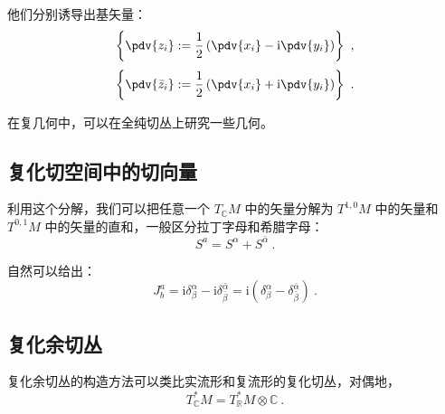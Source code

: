 他们分别诱导出基矢量：
\begin{equation}
\left\{ \pdv{z_i} := \frac{1}{2} \left( \pdv{x_i} - \mathrm i \pdv{y_i} \right) \right\} ~,
\end{equation}
\begin{equation} 
\left\{ \pdv{\bar z_i} := \frac{1}{2} \left( \pdv{x_i} + \mathrm i \pdv{y_i} \right)\right\} ~.
\end{equation}

在复几何中，可以在全纯切丛上研究一些几何。

\subsection{复化切空间中的切向量}
利用这个分解，我们可以把任意一个 $T_\mathbb C M$ 中的矢量分解为 $T^{1, 0} M$ 中的矢量和 $T^{0, 1} M$ 中的矢量的直和，一般区分拉丁字母和希腊字母：
\begin{equation}
S^a = S^\alpha + S^{\bar \alpha} ~.
\end{equation}

自然可以给出：
\begin{equation}
J^a_b = \mathrm i \delta^\alpha_\beta - \mathrm i \delta^{\bar \alpha}_{\bar \beta} = \mathrm i(\delta^\alpha_\beta - \delta^{\bar \alpha}_{\bar \beta} )~.
\end{equation}

\subsection{复化余切丛}
复化余切丛的构造方法可以类比实流形和复流形的复化切丛，对偶地，
\begin{equation}
T^*_\mathbb C M = T^*_\mathbb R M \otimes \mathbb C ~.
\end{equation}

